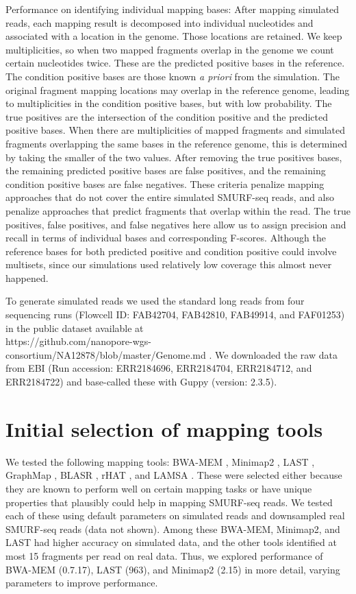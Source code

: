 Performance on identifying individual mapping bases: After mapping
simulated reads, each mapping result is decomposed into individual
nucleotides and associated with a location in the genome. Those
locations are retained. We keep multiplicities, so when two mapped
fragments overlap in the genome we count certain nucleotides twice.
These are the predicted positive bases in the reference.  The condition
positive bases are those known \textit{a priori} from the simulation.
The original fragment mapping locations may overlap in the reference
genome, leading to multiplicities in the condition positive bases, but
with low probability. The true positives are the intersection of the
condition positive and the predicted positive bases. When there are
multiplicities of mapped fragments and simulated fragments overlapping
the same bases in the reference genome, this is determined by taking the
smaller of the two values. After removing the true positives bases, the
remaining predicted positive bases are false positives, and the
remaining condition positive bases are false negatives. These criteria
penalize mapping approaches that do not cover the entire simulated
SMURF-seq reads, and also penalize approaches that predict fragments
that overlap within the read. The true positives, false positives, and
false negatives here allow us to assign precision and recall in terms of
individual bases and corresponding F-scores. Although the reference
bases for both predicted positive and condition positive could involve
multisets, since our simulations used relatively low coverage this
almost never happened.

To generate simulated reads we used the standard long reads from four
sequencing runs (Flowcell ID: FAB42704, FAB42810, FAB49914, and
FAF01253) in the public dataset available at \\
https://github.com/nanopore-wgs-consortium/NA12878/blob/master/Genome.md
\citep{jain2018nanopore,jain2018nanopore_git}. We downloaded the raw data
from EBI (Run accession: ERR2184696, ERR2184704, ERR2184712, and
ERR2184722) and base-called these with Guppy (version: 2.3.5).


\section*{Initial selection of mapping tools}
We tested the following mapping tools: BWA-MEM \citep{li2013aligning},
Minimap2 \citep{li2018minimap2}, LAST \citep{kielbasa2011adaptive},
GraphMap \citep{sovic2016fast}, BLASR \citep{chaisson2012mapping},
rHAT \citep{liu2015rhat}, and LAMSA \citep{liu2017lamsa}. These were
selected either because they are known to perform well on certain
mapping tasks or have unique properties that plausibly could help in
mapping SMURF-seq reads. We tested each of these using default
parameters on simulated reads and downsampled real SMURF-seq
reads (data not shown). Among these BWA-MEM, Minimap2, and LAST had
higher accuracy on simulated data, and the other tools identified at
most 15 fragments per read on real data. Thus, we explored performance
of BWA-MEM (0.7.17), LAST (963), and Minimap2 (2.15) in more detail,
varying parameters to improve performance.

